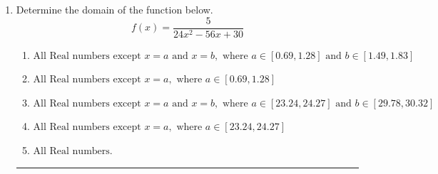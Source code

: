 \documentclass[14pt]{extbook}
\newcommand{\litem}[1]{\item#1\hspace*{-1cm}\rule{\textwidth}{0.4pt}}
\begin{document}
\begin{enumerate}
{\begin{enumerate}[label=\Alph*.]
\end{enumerate} }
\litem{
Determine the domain of the function below.\[ f(x) = \frac{5}{24x^{2} -56 x + 30} \]\begin{enumerate}[label=\Alph*.]
\item \( \text{All Real numbers except } x = a \text{ and } x = b, \text{ where } a \in [0.69, 1.28] \text{ and } b \in [1.49, 1.83] \)
\item \( \text{All Real numbers except } x = a, \text{ where } a \in [0.69, 1.28] \)
\item \( \text{All Real numbers except } x = a \text{ and } x = b, \text{ where } a \in [23.24, 24.27] \text{ and } b \in [29.78, 30.32] \)
\item \( \text{All Real numbers except } x = a, \text{ where } a \in [23.24, 24.27] \)
\item \( \text{All Real numbers.} \)


\end{enumerate}}
\end{enumerate}
\end{document}
